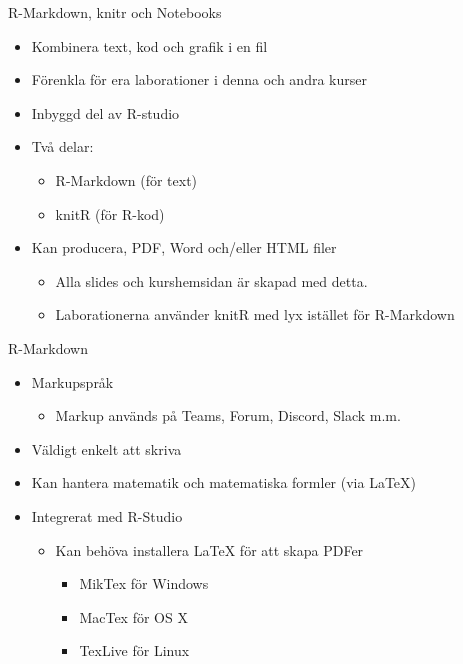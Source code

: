 \documentclass[
  11pt,
  ignorenonframetext,
  handout]{beamer}
\providecommand{\tightlist}{%
  \setlength{\itemsep}{0pt}\setlength{\parskip}{0pt}}
\begin{document}
\begin{frame}{R-Markdown, knitr och Notebooks}
\label{r-markdown-knitr-och-notebooks-1}
\begin{itemize}
\tightlist
\item
  Kombinera text, kod och grafik i en fil
\item
  Förenkla för era laborationer i denna och andra kurser
\item
  Inbyggd del av R-studio
\item
  Två delar:

  \begin{itemize}
  \tightlist
  \item
    R-Markdown (för text)
  \item
    knitR (för R-kod)
  \end{itemize}
\item
  Kan producera, PDF, Word och/eller HTML filer

  \begin{itemize}
  \tightlist
  \item
    Alla slides och kurshemsidan är skapad med detta.
  \item
    Laborationerna använder knitR med lyx istället för R-Markdown
  \end{itemize}
\end{itemize}
\end{frame}

\begin{frame}{R-Markdown}
\label{r-markdown}
\begin{itemize}
\tightlist
\item
  Markupspråk

  \begin{itemize}
  \tightlist
  \item
    Markup används på Teams, Forum, Discord, Slack m.m.
  \end{itemize}
\item
  Väldigt enkelt att skriva
\item
  Kan hantera matematik och matematiska formler (via LaTeX)
\item
  Integrerat med R-Studio

  \begin{itemize}
  \tightlist
  \item
    Kan behöva installera LaTeX för att skapa PDFer

    \begin{itemize}
    \tightlist
    \item
      MikTex för Windows
    \item
      MacTex för OS X
    \item
      TexLive för Linux
    \end{itemize}
  \end{itemize}
\end{itemize}
\end{frame}
\end{document}
